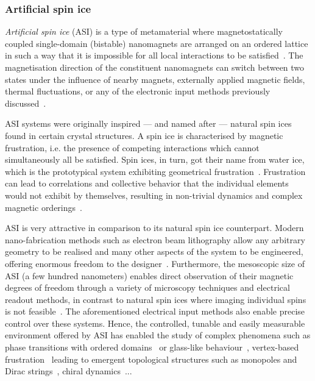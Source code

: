 \subsubsection{Artificial spin ice}\label{sec:1:ASI}
\textit{Artificial spin ice} (ASI) is a type of metamaterial where magnetostatically coupled single-domain (bistable) nanomagnets are arranged on an ordered lattice in such a way that it is impossible for all local interactions to be satisfied~\cite{RC_ASI,flatspin}.
The magnetisation direction of the constituent nanomagnets can switch between two states under the influence of nearby magnets, externally applied magnetic fields, thermal fluctuations, or any of the electronic input methods previously discussed~\cite{CoerciveFieldReversal,BrownThermalFluctuations,SOT_FM_AFM,brataas2012current}. \par
ASI systems were originally inspired --- and named after --- natural spin ices found in certain crystal structures.
A spin ice is characterised by magnetic frustration, i.e. the presence of competing interactions which cannot simultaneously all be satisfied.
Spin ices, in turn, got their name from water ice, which is the prototypical system exhibiting geometrical frustration~\cite{nisoli2013colloquium,ZeroPointEntropy,heyderman2013artificial,MagnetizationDynamicsASI}.
Frustration can lead to correlations and collective behavior that the individual elements would not exhibit by themselves, resulting in non-trivial dynamics and complex magnetic orderings~\cite{AdvancesASI,ASI_computation,ApparentFMpinwheel}. \par
ASI is very attractive in comparison to its natural spin ice counterpart.
Modern nano-fabrication methods such as electron beam lithography allow any arbitrary geometry to be realised and many other aspects of the system to be engineered, offering enormous freedom to the designer~\cite{AdvancesASI,ASI_computation}.
Furthermore, the mesoscopic size of ASI (a few hundred nanometers) enables direct observation of their magnetic degrees of freedom through a variety of microscopy techniques and electrical readout methods, in contrast to natural spin ices where imaging individual spins is not feasible~\cite{nisoli2013colloquium,freeman2001advances}.
The aforementioned electrical input methods also enable precise control over these systems.
Hence, the controlled, tunable and easily measurable environment offered by ASI has enabled the study of complex phenomena such as phase transitions with ordered domains~\cite{ApparentFMpinwheel,sklenar2019field,MeltingASI,ImagingBridgedKagome,sendetskyi2019continuous,lou2023competing,branford2012emerging} or glass-like behaviour~\cite{wang2006artificial,ZeroPointEntropy}, vertex-based frustration~\cite{morrison2013unhappy} leading to emergent topological structures such as monopoles and Dirac strings~\cite{ObservationMonopoleASI,mengotti2011kagome}, chiral dynamics~\cite{branford2012emerging,EmergentChiralityRatchet}...
